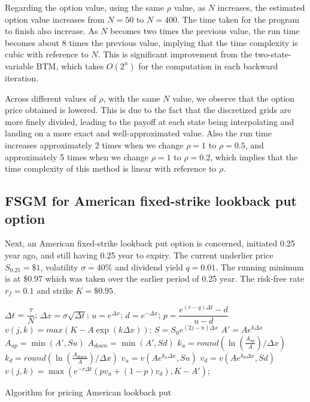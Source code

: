 Regarding the option value, using the same $\rho$ value, as $N$ increases, the estimated option value increases from $N = 50$ to $N = 400$. The time taken for the program to finish also increase. As $N
$ becomes two times the previous value, the run time becomes about 8 times the previous value, implying that the time complexity is cubic with reference to $N$. This is significant improvement from the two-state-variable BTM, which takes $O(2^n)$ for the computation in each backward iteration.

Across different values of $\rho$, with the same $N$ value, we observe that the option price obtained is lowered. This is due to the fact that the discretized grids are more finely divided, leading to the payoff at each state being interpolating and landing on a more exact and well-approximated value. Also the run time increases approximately 2 times when we change $\rho=1$ to $\rho=0.5$, and approximately 5 times when we change $\rho=1$ to $\rho=0.2$, which implies that the time complexity of this method is linear with reference to $\rho$.

\subsection{FSGM for American fixed-strike lookback put option}
Next, an American fixed-strike lookback put option is concerned, initiated 0.25 year ago, and still having 0.25 year to expiry. The current underlier price $S_{0.25}=\$1$, volatility $\sigma=40\%$ and dividend yield $q = 0.01$. The running minimum is at $\$0.97$ which was taken over the earlier period of 0.25 year. The risk-free rate $r_f=0.1$ and strike $K=\$0.95$.

\begin{algorithm}[H]
	$\Delta t$ = $\dfrac{\tau}{N}$;
	$\Delta x = \sigma \sqrt{\Delta t}$;
	$u = e^{\Delta x}$;
	$d = e^{-\Delta x}$;
	$p = \dfrac{e^{(r-q) \Delta t} - d}{u - d}$\;
	 {
		 {
			$v(j, k) = max(K - A \exp(k \Delta x))$;
		}
	}
	 {
		 {
			 {
				$S = S_{0} e^{(2j - n) \Delta x}$\;
				$A' = A e^{k \Delta x}$\;
				$A_{up} = \min(A', Su)$\;
				$A_{down} = \min(A', Sd)$\;
				$k_{u} = round(\ln(\frac{A_{up}}{A}) / \Delta x)$\;
				$k_{d} = round(\ln(\frac{A_{down}}{A}) / \Delta x)$\;
				$v_{u} = v(A e^{k_{u}\Delta x}, Su)$\;
				$v_{d} = v(A e^{k_{d}\Delta x}, Sd)$\;
				$v(j,k) = \max(e^{-r \Delta t}(pv_{u} + (1-p)v_{d}), K - A')$;
			}
		}
	}
\caption{Algorithm for pricing American lookback put}
\end{algorithm}

